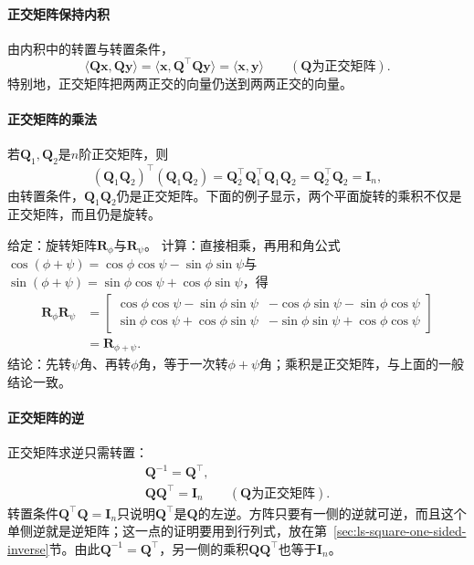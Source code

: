 \paragraph{正交矩阵保持内积}
由内积中的转置与转置条件，
\[
 \langle\bm Q\bm x,\bm Q\bm y\rangle=\langle\bm x,\bm Q^\top\bm Q\bm y\rangle=\langle\bm x,\bm y\rangle\qquad(\bm Q\text{为正交矩阵}).
\]
特别地，正交矩阵把两两正交的向量仍送到两两正交的向量。

\paragraph{正交矩阵的乘法}
若$\bm Q_1,\bm Q_2$是$n$阶正交矩阵，则
\[
 (\bm Q_1\bm Q_2)^\top(\bm Q_1\bm Q_2)=\bm Q_2^\top\bm Q_1^\top\bm Q_1\bm Q_2=\bm Q_2^\top\bm Q_2=\bm I_n,
\]
由转置条件，$\bm Q_1\bm Q_2$仍是正交矩阵。下面的例子显示，两个平面旋转的乘积不仅是正交矩阵，而且仍是旋转。
\begin{example}[两个平面旋转的乘积]
\label{ex:ls-rotation-composition}
给定：旋转矩阵$\bm R_\phi$与$\bm R_\psi$。
计算：直接相乘，再用和角公式$\cos(\phi+\psi)=\cos\phi\cos\psi-\sin\phi\sin\psi$与$\sin(\phi+\psi)=\sin\phi\cos\psi+\cos\phi\sin\psi$，得
\[
 \begin{aligned}
 \bm R_\phi\bm R_\psi
 &=\begin{bmatrix}\cos\phi\cos\psi-\sin\phi\sin\psi&-\cos\phi\sin\psi-\sin\phi\cos\psi\\\sin\phi\cos\psi+\cos\phi\sin\psi&-\sin\phi\sin\psi+\cos\phi\cos\psi\end{bmatrix}\\
 &=\bm R_{\phi+\psi}.
 \end{aligned}
\]
结论：先转$\psi$角、再转$\phi$角，等于一次转$\phi+\psi$角；乘积是正交矩阵，与上面的一般结论一致。
\end{example}

\paragraph{正交矩阵的逆}
正交矩阵求逆只需转置：
\[
\begin{gathered}
\bm Q^{-1}=\bm Q^\top,\\
\bm Q\bm Q^\top=\bm I_n\qquad(\bm Q\text{为正交矩阵}).
\end{gathered}
\]
转置条件$\bm Q^\top\bm Q=\bm I_n$只说明$\bm Q^\top$是$\bm Q$的左逆。方阵只要有一侧的逆就可逆，而且这个单侧逆就是逆矩阵；这一点的证明要用到行列式，放在第~\ref{sec:ls-square-one-sided-inverse}节。由此$\bm Q^{-1}=\bm Q^\top$，另一侧的乘积$\bm Q\bm Q^\top$也等于$\bm I_n$。

